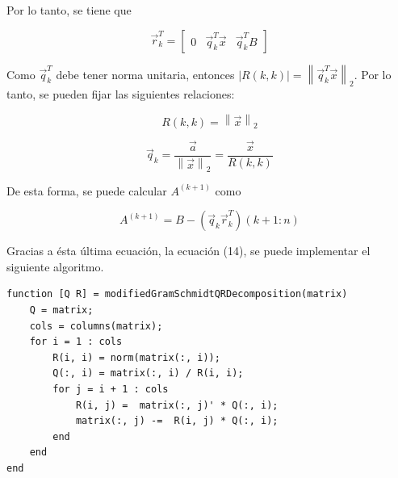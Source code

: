 \documentclass[spanish]{article}
\newcommand\abs[1]{\left|#1\right|}
\newcommand\norm[1]{\left\lVert#1\right\rVert}
\begin{document}
            Por lo tanto, se tiene que
            
            \begin{equation}
                \vec{r}^{T}_{k} = 
                \begin{bmatrix}
                    0 & \vec{q}^{T}_{k} \vec{x} & \vec{q}^{T}_{k} B
                \end{bmatrix}
            \end{equation}
             
                    
            Como $\vec{q}^{T}_{k}$ debe tener norma unitaria, entonces $\abs{R(k,k)} = \norm{\vec{q}^{T}_{k} \vec{x}}_{2}$. Por lo tanto, se pueden fijar las siguientes relaciones:
            
            \begin{equation}
                R(k,k) = \norm{\vec{x}}_{2}
            \end{equation}
            
            \begin{equation}
                \vec{q}_{k} = \dfrac{\vec{a}}{\norm{\vec{x}}_{2}} = \dfrac{\vec{x}}{R(k,k)}
            \end{equation}
            
            De esta forma, se puede calcular $A^{(k + 1)}$ como
            
            \begin{equation}
                A^{(k + 1)} = B - (\vec{q}_{k} \vec{r}^{T}_{k})(k + 1 : n)
            \end{equation}
            
            
             \vspace{5mm}
             
            \par Gracias a ésta última ecuación, la ecuación (14), se puede implementar el siguiente algoritmo.
            
            \begin{lstlisting}[caption = Descomposición $QR$ por Gram-Schmidt modificado]
function [Q R] = modifiedGramSchmidtQRDecomposition(matrix)
	Q = matrix;
	cols = columns(matrix);
	for i = 1 : cols
		R(i, i) = norm(matrix(:, i));
		Q(:, i) = matrix(:, i) / R(i, i);
		for j = i + 1 : cols
			R(i, j) =  matrix(:, j)' * Q(:, i);
			matrix(:, j) -=  R(i, j) * Q(:, i);
		end
	end
end
            \end{lstlisting}
\end{document}
